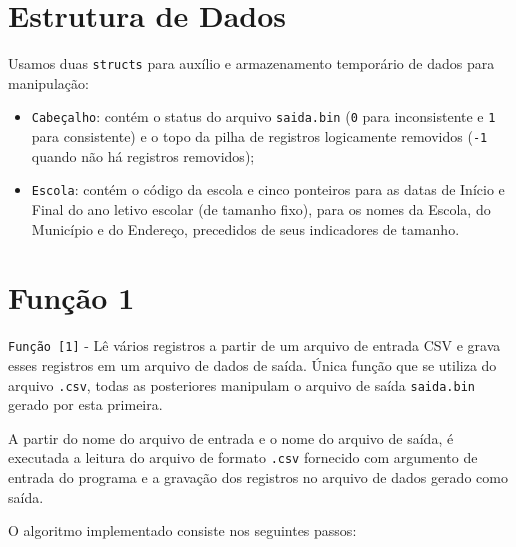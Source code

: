 \documentclass[
	12pt,				%
	openany,			%
	twoside,			%
	a4paper,			%
	english,			%
	french,				%
	spanish,			%
	brazil,				%
	]{abntex2}
\begin{document}
\section{Estrutura de Dados}
    Usamos duas \verb|structs| para auxílio e armazenamento temporário de dados para manipulação:
     \begin{itemize}
     \item  \verb|Cabeçalho|: contém  o status do arquivo \verb|saida.bin| (\verb|0| para inconsistente e \verb|1| para consistente) e o topo da pilha de registros logicamente removidos (\verb|-1| quando não há registros removidos);
    \item \verb|Escola|: contém o código da escola e cinco ponteiros para as datas de Início e Final do ano letivo escolar (de tamanho fixo),  para os nomes da Escola, do Município e do Endereço, precedidos de seus indicadores de tamanho.
     \end{itemize}
\section{Função 1}

    \verb|Função [1]| - Lê vários registros a partir de um arquivo de entrada CSV e grava esses registros em um arquivo de dados de saída. Única função que se utiliza do arquivo \verb|.csv|, todas as posteriores manipulam o arquivo de saída \verb|saida.bin| gerado por esta primeira.
    
    A partir do nome do arquivo de entrada e o nome do arquivo de saída, é executada a leitura do arquivo de formato \verb|.csv| fornecido com argumento de entrada do programa e a gravação dos registros no arquivo de dados gerado como saída.
    
O algoritmo implementado consiste nos seguintes passos:
\end{document}
